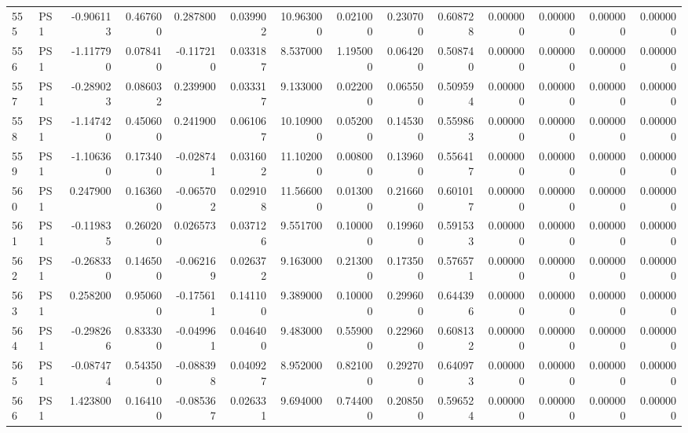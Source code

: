 \begin{tabular}{llrrrrrrrrrrrr}
555 &    PS1 & -0.906113 &      0.467600 &  0.287800 &    0.039902 &  10.963000 &      0.021000 &   0.230700 &  0.608728 &  0.000000 &   0.000000 &     0.000000 &     0.000000 \\
556 &    PS1 & -1.117790 &      0.078410 & -0.117210 &    0.033187 &   8.537000 &      1.195000 &   0.064200 &  0.508740 &  0.000000 &   0.000000 &     0.000000 &     0.000000 \\
557 &    PS1 & -0.289023 &      0.086032 &  0.239900 &    0.033317 &   9.133000 &      0.022000 &   0.065500 &  0.509594 &  0.000000 &   0.000000 &     0.000000 &     0.000000 \\
558 &    PS1 & -1.147420 &      0.450600 &  0.241900 &    0.061067 &  10.109000 &      0.052000 &   0.145300 &  0.559863 &  0.000000 &   0.000000 &     0.000000 &     0.000000 \\
559 &    PS1 & -1.106360 &      0.173400 & -0.028741 &    0.031602 &  11.102000 &      0.008000 &   0.139600 &  0.556417 &  0.000000 &   0.000000 &     0.000000 &     0.000000 \\
560 &    PS1 &  0.247900 &      0.163600 & -0.065702 &    0.029108 &  11.566000 &      0.013000 &   0.216600 &  0.601017 &  0.000000 &   0.000000 &     0.000000 &     0.000000 \\
561 &    PS1 & -0.119835 &      0.260200 &  0.026573 &    0.037126 &   9.551700 &      0.100000 &   0.199600 &  0.591533 &  0.000000 &   0.000000 &     0.000000 &     0.000000 \\
562 &    PS1 & -0.268330 &      0.146500 & -0.062169 &    0.026372 &   9.163000 &      0.213000 &   0.173500 &  0.576571 &  0.000000 &   0.000000 &     0.000000 &     0.000000 \\
563 &    PS1 &  0.258200 &      0.950600 & -0.175611 &    0.141100 &   9.389000 &      0.100000 &   0.299600 &  0.644396 &  0.000000 &   0.000000 &     0.000000 &     0.000000 \\
564 &    PS1 & -0.298266 &      0.833300 & -0.049961 &    0.046400 &   9.483000 &      0.559000 &   0.229600 &  0.608132 &  0.000000 &   0.000000 &     0.000000 &     0.000000 \\
565 &    PS1 & -0.087474 &      0.543500 & -0.088398 &    0.040927 &   8.952000 &      0.821000 &   0.292700 &  0.640973 &  0.000000 &   0.000000 &     0.000000 &     0.000000 \\
566 &    PS1 &  1.423800 &      0.164100 & -0.085367 &    0.026331 &   9.694000 &      0.744000 &   0.208500 &  0.596524 &  0.000000 &   0.000000 &     0.000000 &     0.000000 \\

\end{tabular}
